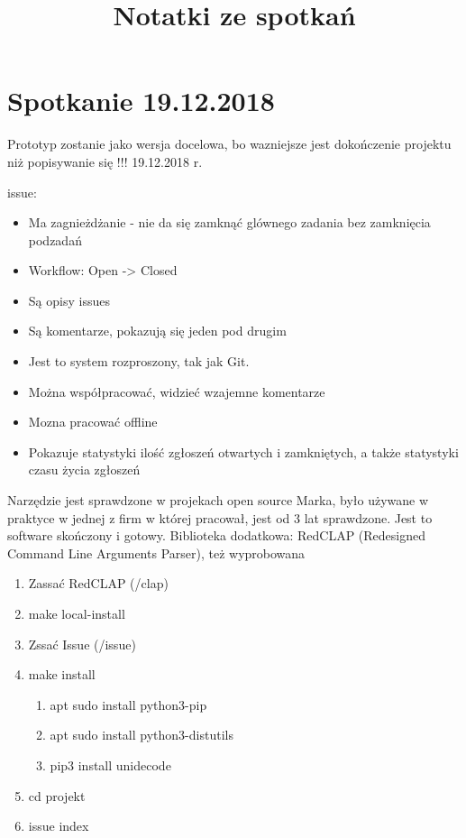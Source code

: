 \documentclass[11pt,oneside,a4paper,onecolumn]{article}
\title{Notatki ze spotkań}
\begin{document}
\maketitle

\section{Spotkanie 19.12.2018}
Prototyp zostanie jako wersja docelowa, bo wazniejsze jest dokończenie projektu niż popisywanie się !!! 19.12.2018 r.

issue:

\begin{itemize}
\item Ma zagnieżdżanie - nie da się zamknąć glównego zadania bez zamknięcia podzadań
\item Workflow: Open -> Closed
\item Są opisy issues
\item Są komentarze, pokazują się jeden pod drugim
\item Jest to system rozproszony, tak jak Git.
\item Można współpracować, widzieć wzajemne komentarze
\item Mozna pracować offline
\item Pokazuje statystyki ilość zgłoszeń otwartych i zamkniętych, a także statystyki czasu życia zgłoszeń
\end{itemize}

Narzędzie jest sprawdzone w projekach open source Marka, było używane w praktyce w jednej z firm w której pracował, jest od 3 lat sprawdzone. Jest to software skończony i gotowy.
Biblioteka dodatkowa: RedCLAP (Redesigned Command Line Arguments Parser), też wyprobowana

\begin{enumerate}
\item Zassać RedCLAP (/clap)
\item make local-install
\item Zssać Issue (/issue)
\item make install
	\begin{enumerate}
	\item apt sudo install python3-pip
	\item apt sudo install python3-distutils
	\item pip3 install unidecode
	\end{enumerate}
\item cd projekt
\item issue index
\end{enumerate}
\end{document}
